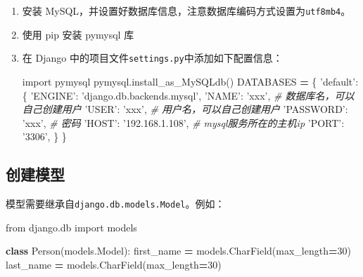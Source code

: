\documentclass[]{ctexbook}
\newenvironment{Shaded}{\begin{snugshade}}{\end{snugshade}}
\newcommand{\CommentTok}[1]{\textcolor[rgb]{0.56,0.35,0.01}{\textit{#1}}}
\newcommand{\DecValTok}[1]{\textcolor[rgb]{0.00,0.00,0.81}{#1}}
\newcommand{\ImportTok}[1]{#1}
\newcommand{\KeywordTok}[1]{\textcolor[rgb]{0.13,0.29,0.53}{\textbf{#1}}}
\newcommand{\NormalTok}[1]{#1}
\newcommand{\OperatorTok}[1]{\textcolor[rgb]{0.81,0.36,0.00}{\textbf{#1}}}
\newcommand{\StringTok}[1]{\textcolor[rgb]{0.31,0.60,0.02}{#1}}
\begin{document}
\begin{enumerate}
\def\labelenumi{\arabic{enumi}.}
\item
  安装 MySQL，并设置好数据库信息，注意数据库编码方式设置为\texttt{utf8mb4}。
\item
  使用 pip 安装 pymysql 库
\item
  在 Django 中的项目文件\texttt{settings.py}中添加如下配置信息：

\begin{Shaded}
\begin{Highlighting}[]
\ImportTok{import}\NormalTok{ pymysql}
\NormalTok{pymysql.install_as_MySQLdb()}
\NormalTok{DATABASES }\OperatorTok{=}\NormalTok{ \{}
     \StringTok{'default'}\NormalTok{: \{}
         \StringTok{'ENGINE'}\NormalTok{: }\StringTok{'django.db.backends.mysql'}\NormalTok{,}
         \StringTok{'NAME'}\NormalTok{: }\StringTok{'xxx'}\NormalTok{,  }\CommentTok{# 数据库名，可以自己创建用户}
         \StringTok{'USER'}\NormalTok{: }\StringTok{'xxx'}\NormalTok{,  }\CommentTok{# 用户名，可以自己创建用户}
         \StringTok{'PASSWORD'}\NormalTok{: }\StringTok{'xxx'}\NormalTok{,  }\CommentTok{# 密码}
         \StringTok{'HOST'}\NormalTok{: }\StringTok{'192.168.1.108'}\NormalTok{,  }\CommentTok{# mysql服务所在的主机ip}
         \StringTok{'PORT'}\NormalTok{: }\StringTok{'3306'}\NormalTok{,}
\NormalTok{     \}}
\NormalTok{ \}}
\end{Highlighting}
\end{Shaded}
\end{enumerate}

\hypertarget{ux521bux5efaux6a21ux578b-1}{%
\subsection{创建模型}\label{ux521bux5efaux6a21ux578b-1}}

模型需要继承自\texttt{django.db.models.Model}。例如：

\begin{Shaded}
\begin{Highlighting}[]
\ImportTok{from}\NormalTok{ django.db }\ImportTok{import}\NormalTok{ models}

\KeywordTok{class}\NormalTok{ Person(models.Model):}
\NormalTok{    first_name }\OperatorTok{=}\NormalTok{ models.CharField(max_length}\OperatorTok{=}\DecValTok{30}\NormalTok{)}
\NormalTok{    last_name }\OperatorTok{=}\NormalTok{ models.CharField(max_length}\OperatorTok{=}\DecValTok{30}\NormalTok{)}
\end{Highlighting}
\end{Shaded}
\end{document}
